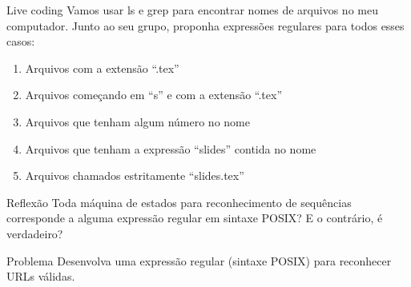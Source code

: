 \documentclass{beamer}
\begin{document}
\begin{frame}{Live coding}
  \centering
  \large
  Vamos usar ls e grep para encontrar nomes de arquivos no meu computador. Junto
  ao seu grupo, proponha expressões regulares para todos esses casos:
  \begin{enumerate}
    \item Arquivos com a extensão ``.tex''
    \item Arquivos começando em ``s'' e com a extensão ``.tex''
    \item Arquivos que tenham algum número no nome
    \item Arquivos que tenham a expressão ``slides'' contida no nome
    \item Arquivos chamados estritamente ``slides.tex''
  \end{enumerate}
\end{frame}

\begin{frame}{Reflexão}
  \centering
  \Large
  Toda máquina de estados para reconhecimento de sequências corresponde a alguma
  expressão regular em sintaxe POSIX? E o contrário, é verdadeiro?
\end{frame}

\begin{frame}{Problema}
  \centering
  \Large
  Desenvolva uma expressão regular (sintaxe POSIX) para reconhecer URLs válidas.
\end{frame}
\end{document}
